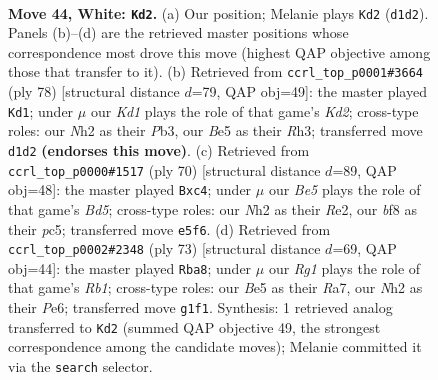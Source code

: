 \documentclass[11pt]{article}
\begin{document}
\clearpage

\begin{figure}[p]\centering
\begin{subfigure}{0.46\textwidth}\centering
\resizebox{\linewidth}{!}{%
\newchessgame
\chessboard[
  setfen={5b1r/1r1k2p1/p1p4p/Pp1bBp2/2p4P/4P1P1/1P3P1N/R2K2R1 w - - 4 44},
  showmover=false,
  pgfstyle=straightmove, color=movearrow, markmove={d1-d2}
]}
\caption{}
\end{subfigure}\hfill
\begin{subfigure}{0.46\textwidth}\centering
\resizebox{\linewidth}{!}{%
\newchessgame
\chessboard[
  setfen={5k2/6p1/p1rp1p1p/1p2pP2/1B1bP3/PP5R/2PK2PP/8 w - - 9 40},
  showmover=false,
  pgfstyle=straightmove, color=movearrow, markmove={d2-d1}
]}
\caption{}
\end{subfigure}
\\[4pt]
\begin{subfigure}{0.46\textwidth}\centering
\resizebox{\linewidth}{!}{%
\newchessgame
\chessboard[
  setfen={1r4k1/3b1p2/p2b2pp/PppB4/2p5/2P4P/4RPP1/R4K2 w - - 0 36},
  showmover=false,
  pgfstyle=straightmove, color=movearrow, markmove={d5-c4}
]}
\caption{}
\end{subfigure}\hfill
\begin{subfigure}{0.46\textwidth}\centering
\resizebox{\linewidth}{!}{%
\newchessgame
\chessboard[
  setfen={1r3k2/rp2bp2/4p1p1/1BPp4/P2P3p/4P2P/K1R3P1/1R6 b - - 4 37},
  showmover=false,
  pgfstyle=straightmove, color=movearrow, markmove={b8-a8}
]}
\caption{}
\end{subfigure}
\caption{\textbf{Move 44, White: \texttt{Kd2}.} (a) Our position; Melanie plays \texttt{Kd2} (\texttt{d1d2}). Panels (b)--(d) are the retrieved master positions whose correspondence most drove this move (highest QAP objective among those that transfer to it). (b) Retrieved from \texttt{ccrl\_top\_p0001\#3664} (ply 78) [structural distance $d$=79, QAP obj=49]: the master played \texttt{Kd1}; under $\mu$ our \emph{Kd1} plays the role of that game's \emph{Kd2}; cross-type roles: our \emph{N}h2 as their \emph{P}b3, our \emph{B}e5 as their \emph{R}h3; transferred move \texttt{d1d2} \textbf{(endorses this move)}. (c) Retrieved from \texttt{ccrl\_top\_p0000\#1517} (ply 70) [structural distance $d$=89, QAP obj=48]: the master played \texttt{Bxc4}; under $\mu$ our \emph{Be5} plays the role of that game's \emph{Bd5}; cross-type roles: our \emph{N}h2 as their \emph{R}e2, our \emph{b}f8 as their \emph{p}c5; transferred move \texttt{e5f6}. (d) Retrieved from \texttt{ccrl\_top\_p0002\#2348} (ply 73) [structural distance $d$=69, QAP obj=44]: the master played \texttt{Rba8}; under $\mu$ our \emph{Rg1} plays the role of that game's \emph{Rb1}; cross-type roles: our \emph{B}e5 as their \emph{R}a7, our \emph{N}h2 as their \emph{P}e6; transferred move \texttt{g1f1}. Synthesis: 1 retrieved analog transferred to \texttt{Kd2} (summed QAP objective 49, the strongest correspondence among the candidate moves); Melanie committed it via the \texttt{search} selector.}
\label{fig:thought-m86}
\end{figure}
\end{document}
